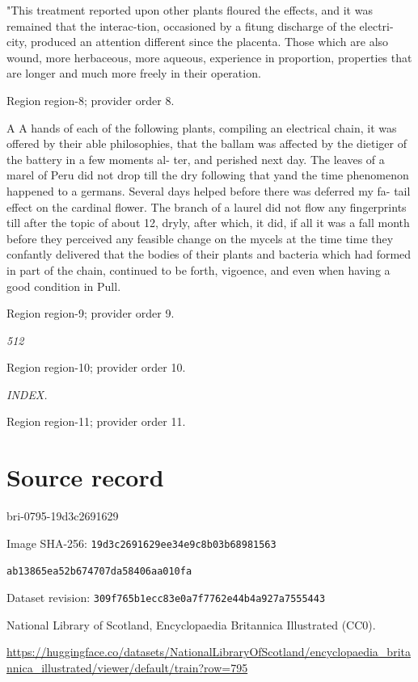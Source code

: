 \documentclass[11pt]{article}
\begin{document}
"This treatment reported upon other plants floured the effects, and it was remained that the interac-tion, occasioned by a fitung discharge of the electri- city, produced an attention different since the placenta. Those which are also wound, more herbaceous, more aqueous, experience in proportion, properties that are longer and much more freely in their operation.
\par

{\scriptsize\color{gray} Region region-8; provider order 8.\par}
\medskip

A A hands of each of the following plants, compiling an electrical chain, it was offered by their able philosophies, that the ballam was affected by the dietiger of the battery in a few moments al- ter, and perished next day. The leaves of a marel of Peru did not drop till the dry following that yand the time phenomenon happened to a germans. Several days helped before there was deferred my fa- tail effect on the cardinal flower. The branch of a laurel did not flow any fingerprints till after the topic of about 12, dryly, after which, it did, if all it was a fall month before they perceived any feasible change on the mycels at the time time they confantly delivered that the bodies of their plants and bacteria which had formed in part of the chain, continued to be forth, vigoence, and even when having a good condition in Pull.
\par

{\scriptsize\color{gray} Region region-9; provider order 9.\par}
\medskip

{\small\itshape 512\par}

{\scriptsize\color{gray} Region region-10; provider order 10.\par}
\medskip

{\small\itshape INDEX.\par}

{\scriptsize\color{gray} Region region-11; provider order 11.\par}
\medskip
\newpage\section*{Source record}
bri-0795-19d3c2691629\par
Image SHA-256: \texttt{19d3c2691629ee34e9c8b03b68981563}\par\texttt{ab13865ea52b674707da58406aa010fa}\par
Dataset revision: \texttt{309f765b1ecc83e0a7f7}\texttt{762e44b4a927a7555443}\par
National Library of Scotland, Encyclopaedia Britannica Illustrated (CC0).\par
\url{https://huggingface.co/datasets/NationalLibraryOfScotland/encyclopaedia_britannica_illustrated/viewer/default/train?row=795}
\end{document}
